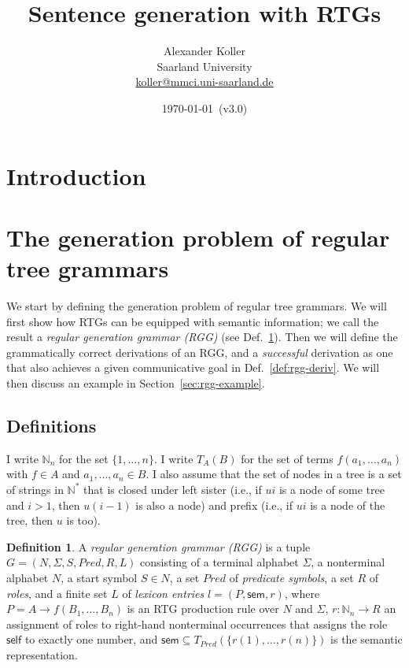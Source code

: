 \documentclass[11pt,a4]{article}
\title{Sentence generation with RTGs}
\author{Alexander Koller \\ Saarland University \\
  \url{koller@mmci.uni-saarland.de}}
\date{\today\ (v3.0)}
\def\N{\mathbb{N}}
\newcommand{\sem}{\mathsf{sem}}
\newcommand{\self}{\mathsf{self}}
\theoremstyle{plain}
\theoremstyle{definition}
\newtheorem{definition}[theorem]{Definition}
\begin{document}
\maketitle

\section{Introduction}

\section{The generation problem of regular tree grammars}

We start by defining the generation problem of regular tree
grammars. We will first show how RTGs can be equipped with semantic
information; we call the result a \emph{regular generation grammar
  (RGG)} (see Def.~\ref{def:rgg}). Then we will define the
grammatically correct derivations of an RGG, and a \emph{successful}
derivation as one that also achieves a given communicative goal in
Def.~\ref{def:rgg-deriv}. We will then discuss an example in
Section~\ref{sec:rgg-example}.


\subsection{Definitions}

I write $\N_n$ for the set $\{1,\ldots,n\}$.  I write $T_A(B)$ for the
set of terms $f(a_1,\ldots,a_n)$ with $f \in A$ and $a_1,\ldots,a_n
\in B$.  I also assume that the set of nodes in a tree is a set of
strings in $\N^*$ that is closed under left sister (i.e., if $ui$ is a
node of some tree and $i>1$, then $u(i-1)$ is also a node) and prefix
(i.e., if $ui$ is a node of the tree, then $u$ is too).

\begin{definition} \label{def:rgg}
  A \emph{regular generation grammar (RGG)} is a tuple $G =
  (N,\Sigma,S,Pred,R,L)$ consisting of a terminal alphabet $\Sigma$, a
  nonterminal alphabet $N$, a start symbol $S \in N$, a set $Pred$ of
  \emph{predicate symbols}, a set $R$ of \emph{roles}, and a finite
  set $L$ of \emph{lexicon entries} $l = (P,\sem,r)$, where $P = A
  \rightarrow f(B_1,\ldots,B_n)$ is an RTG production rule over $N$
  and $\Sigma$, $r:\N_n \rightarrow R$ an assignment of roles to
  right-hand nonterminal occurrences that assigns the role $\self$ to
  exactly one number, and $\sem \subseteq
  T_{Pred}(\{r(1),\ldots,r(n)\})$ is the semantic representation.
\end{definition}
\end{document}
